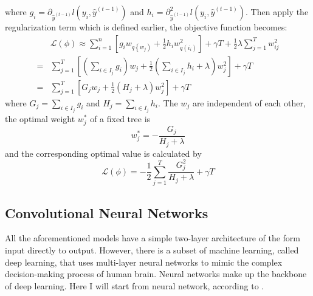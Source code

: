 \documentclass[12pt,a4paper,english
]{tunithesis}
\begin{document}
where $g_i=\partial_{\hat{y}^{(t-1)}} l\left(y_i, \hat{y}^{(t-1)}\right)$ and $h_i=\partial_{\hat{y}^{(t-1)}}^2 l\left(y_i, \hat{y}^{(t-1)}\right)$. Then apply the regularization term which is defined earlier, the objective function becomes:
\begin{equation}
    \begin{aligned}
& \mathcal{L}(\phi) \approx \sum_{i=1}^n\left[g_i w_{q\left\{w_j\right)}+\frac{1}{2} h_i w_{q\left(i_i\right)}^2\right]+\gamma T+\frac{1}{2} \lambda \sum_{j=1}^T w_{i j}^2 \\
= & \sum_{j=1}^T\left[\left(\sum_{i \in I_j} g_i\right) w_j+\frac{1}{2}\left(\sum_{i \in I_j} h_i+\lambda\right) w_j^2\right]+\gamma T \\
= & \sum_{j=1}^T\left[G_j w_j+\frac{1}{2}\left(H_j+\lambda\right) w_j^2\right]+\gamma T
\end{aligned}
\end{equation}
where $G_j=\sum_{i \in I_j} g_i $ and $H_j=\sum_{i \in I_j} h_i$. The $w_j$ are independent of each other, the optimal weight $w_j^*$ of a fixed tree is
\begin{equation}
w_j^*=-\frac{G_j}{H_j+\lambda}
\end{equation}
and the corresponding optimal value is calculated by
\begin{equation}
\mathcal{L}(\phi)=-\frac{1}{2} \sum_{j=1}^T \frac{G_j^2}{H_j+\lambda}+\gamma T
\end{equation}


\subsection{Convolutional Neural Networks}
All the aforementioned models have a simple two-layer architecture of the form input directly to output. However, there is a subset of machine learning, called deep learning, that uses multi-layer neural networks to mimic the complex decision-making process of human brain. Neural networks make up the backbone of deep learning. Here I will start from neural network, according to \textcite{stanford_ml, stanford_cnn, xinyu2019, yamashita2018, veena2024}. 
\end{document}
